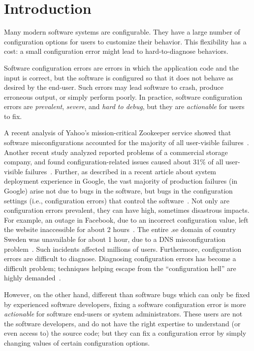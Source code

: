 \section{Introduction}
\label{sec:introduction}

Many modern software systems are configurable. They
have a large number of configuration options for users
to customize their behavior. This flexibility has a cost:
a small configuration error might lead to hard-to-diagnose
behaviors.

Software configuration errors are errors in which
the application code and the input is correct, but the software is
configured so that it does not behave
as desired by the end-user. Such errors may lead software to crash,
produce erroneous output, or simply perform poorly.
In practice, software configuration
errors are \textit{prevalent}, \textit{severe}, and
\textit{hard to debug}, but they are \textit{actionable} for users to fix.


A recent analysis of Yahoo's mission-critical Zookeeper service
showed that software misconfigurations accounted for
the majority of all user-visible failures~\cite{bft}. Another
recent study analyzed reported problems of a commercial
storage company, and found configuration-related issues
caused about 31\% of all user-visible failures~\cite{Yin:2011:ESC}.
Further, as described in a recent article about system deployment experience
in Google, the vast majority of production failures (in Google)
arise not due to bugs in the software, but bugs in the
configuration settings (i.e., configuration errors)
that control the software~\cite{googleconf}.
Not only are configuration errors prevalent, they
can have high, sometimes disastrous impacts. For example,
an outage in Facebook, due to
an incorrect configuration value, left the website 
inaccessible for about 2 hours~\cite{fbout}. 
The entire .se domain of country Sweden was unavailable
for about 1 hour, due to a DNS misconfiguration problem~\cite{sedown}.
Such incidents affected millions of users. Furthermore, configuration
errors are difficult to diagnose. Diagnosing
configuration errors has become a difficult problem; 
techniques helping escape from the ``configuration hell''
are highly demanded~\cite{googleconf}.

However, on the other hand, different than software bugs
which can only be fixed by experienced software developers, fixing a software
configuration error is more \textit{actionable} for software end-users
or system administrators. These users are not the software developers,
and do not have the right expertise to understand (or even access to)
the source code;  but they can fix a configuration error by simply changing
values of certain configuration options.


